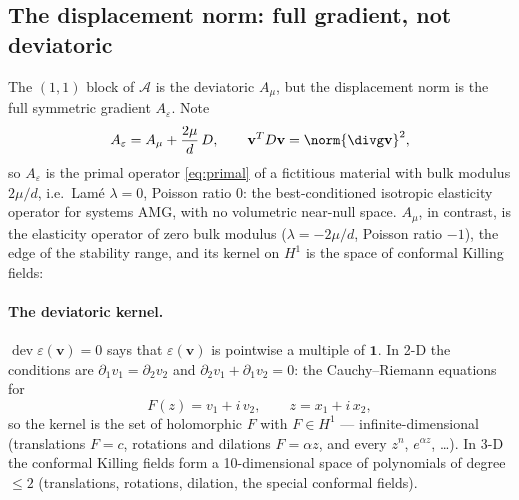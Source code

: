 \documentclass[11pt]{article}
\numberwithin{equation}{section}
\theoremstyle{remark}
\newcommand{\eps}{\varepsilon}
\newcommand{\dev}{\operatorname{dev}}
\newcommand{\vv}{\mathbf{v}}
\newcommand{\one}{\mathbf{1}}
\newcommand{\Ae}{A_{\eps}}
\newcommand{\Amu}{A_{\mu}}
\begin{document}
\subsection{The displacement norm: full gradient, not deviatoric}
\label{sec:norm}

The $(1,1)$ block of $\mathcal A$ is the deviatoric $\Amu$, but the
displacement norm is the full symmetric gradient $\Ae$. Note
\begin{equation}
  \Ae = \Amu + \frac{2\mu}{d}\,D,
  \qquad \vv^TD\vv = \norm{\divg\vv}^2 ,
\end{equation}
so $\Ae$ is the primal operator \eqref{eq:primal} of a fictitious material
with bulk modulus $2\mu/d$, i.e.\ Lamé $\lambda = 0$, Poisson ratio $0$:
the best-conditioned isotropic elasticity operator for systems AMG, with no
volumetric near-null space. $\Amu$, in contrast, is the elasticity
operator of zero bulk modulus ($\lambda = -2\mu/d$, Poisson ratio $-1$),
the edge of the stability range, and its kernel on $H^1$ is the space of
conformal Killing fields:

\paragraph{The deviatoric kernel.} $\dev\eps(\vv) = 0$ says that $\eps(\vv)$
is pointwise a multiple of $\one$. In 2-D the conditions are $\partial_1v_1
= \partial_2v_2$ and $\partial_2v_1 + \partial_1v_2 = 0$: the
Cauchy--Riemann equations for
\begin{equation}
  F(z) = v_1 + i\,v_2, \qquad z = x_1 + i\,x_2 ,
\end{equation}
so the kernel is the set of holomorphic $F$ with $F\in H^1$ ---
infinite-dimensional (translations $F = c$, rotations and dilations $F =
\alpha z$, and every $z^n$, $e^{\alpha z}$, \ldots). In 3-D the conformal
Killing fields form a 10-dimensional space of polynomials of degree $\le2$
(translations, rotations, dilation, the special conformal fields).
\end{document}
